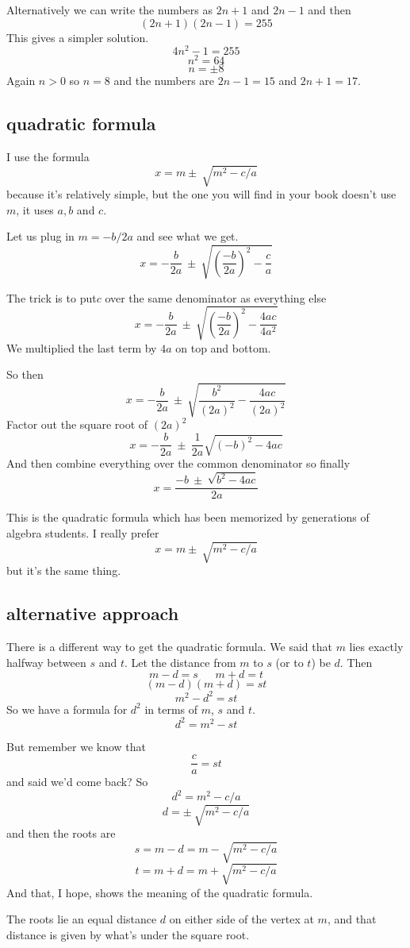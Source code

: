 \documentclass[11pt, oneside]{article}
\begin{document}
Alternatively we can write the numbers as $2n + 1$ and $2n - 1$ and then
\[ (2n + 1)(2n - 1) = 255 \]
This gives a simpler solution.
\[ 4n^2 - 1 = 255 \]
\[ n^2 = 64 \]
\[ n = \pm 8 \]
Again $n > 0$ so $n = 8$ and the numbers are $2n - 1 = 15$ and $2n + 1 = 17$.

\subsection*{quadratic formula}
I use the formula
\[ x = m \pm \ \sqrt{m^2 - c/a} \]
because it's relatively simple, but the one you will find in your book doesn't use $m$, it uses $a,b$ and $c$.

Let us plug in $m = -b/2a$ and see what we get.
\[ x = - \frac{b}{2a} \ \pm \ \sqrt{(\frac{-b}{2a})^2 - \frac{c}{a}} \]

The trick is to put$c$ over the same denominator as everything else
\[ x = - \frac{b}{2a} \ \pm \ \sqrt{(\frac{-b}{2a})^2 - \frac{4ac}{4a^2}} \]
We multiplied the last term by $4a$ on top and bottom.

So then
\[ x = - \frac{b}{2a} \ \pm \ \sqrt{\frac{b^2}{(2a)^2} - \frac{4ac}{(2a)^2}} \]
Factor out the square root of $(2a)^2$
\[ x = - \frac{b}{2a} \ \pm \ \frac{1}{2a} \sqrt{(-b)^2 - 4ac} \]
And then combine everything over the common denominator so finally
\[ x = \frac{- b \ \pm \ \sqrt{b^2 - 4ac}}{2a} \]

This is the quadratic formula which has been memorized by generations of algebra students.  I really prefer
\[ x = m \pm \ \sqrt{m^2 - c/a} \]
but it's the same thing.

\subsection*{alternative approach}
There is a different way to get the quadratic formula.  We said that $m$ lies exactly halfway between $s$ and $t$.  Let the distance from $m$ to $s$ (or to $t$) be $d$.  Then
\[ m - d = s \ \ \ \ \ \ \ m + d = t \]
\[ (m - d)(m + d) = st \]
\[ m^2 - d^2 = st \]
So we have a formula for $d^2$ in terms of $m$, $s$ and $t$.
\[ d^2 = m^2 - st \]

But remember we know that
\[ \frac{c}{a} = st \]
and said we'd come back?  So
\[ d^2 = m^2 - c/a \]
\[ d = \pm \ \sqrt{m^2 - c/a} \]
and then the roots are
\[ s = m - d = m - \sqrt{m^2 - c/a} \]
\[ t = m + d = m + \sqrt{m^2 - c/a} \]
And that, I hope, shows the meaning of the quadratic formula.

The roots lie an equal distance $d$ on either side of the vertex at $m$, and that distance is given by what's under the square root.
\end{document}
